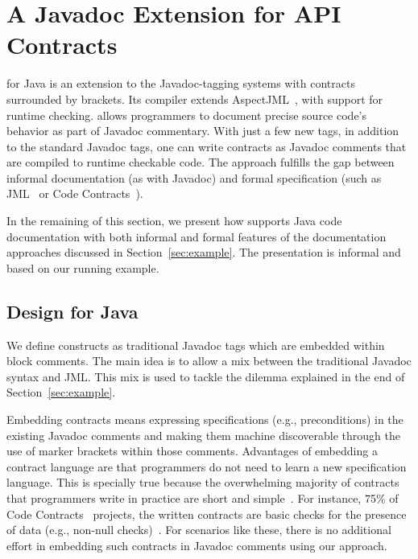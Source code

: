 \section{A Javadoc Extension for API Contracts}
\label{sec:approach}

\contractjdoc{} for Java is an extension to the Javadoc-tagging systems with
contracts surrounded by brackets. Its compiler
extends AspectJML~\cite{aspectjml}, with support for runtime checking.
\contractjdoc{} allows programmers to document precise source code's behavior as
part of Javadoc commentary. With just a few new tags, in addition to the
standard Javadoc tags, one can write contracts as Javadoc comments that are
compiled to runtime checkable code.
The \contractjdoc{} approach fulfills the gap between informal documentation
(as with Javadoc) and formal specification (such as JML~\cite{jml} or
Code Contracts~\cite{codeContractsPaper}).

In the remaining of this section, we present how \contractjdoc{} supports Java code
documentation with both informal and formal features of the documentation
approaches discussed in Section~\ref{sec:example}. The presentation is
informal and based on our running example.

\subsection{\contractjdoc{} Design for Java}

We define \contractjdoc{} constructs as traditional Javadoc tags which are embedded within
block comments. The main idea is to allow a mix between the traditional Javadoc
syntax and JML. This mix is used to tackle the dilemma explained in the end of
Section~\ref{sec:example}.

Embedding contracts means expressing specifications
(e.g., preconditions) in the existing Javadoc comments
and making them machine discoverable through the use of
marker brackets within those comments.
Advantages of embedding a contract language are that
programmers do not need to learn a new specification language.
This is specially true because the overwhelming majority of contracts that programmers write in
practice are short and simple~\cite{Estler-etal14,typeContracts}.
For instance, 75\% of Code Contracts~\cite{codeContractsPaper} projects,
the written contracts are basic checks for the presence of data
(e.g., non-null checks)~\cite{typeContracts}. For scenarios like these,
there is no additional effort in embedding such contracts in Javadoc comments
using our \contractjdoc{} approach.

